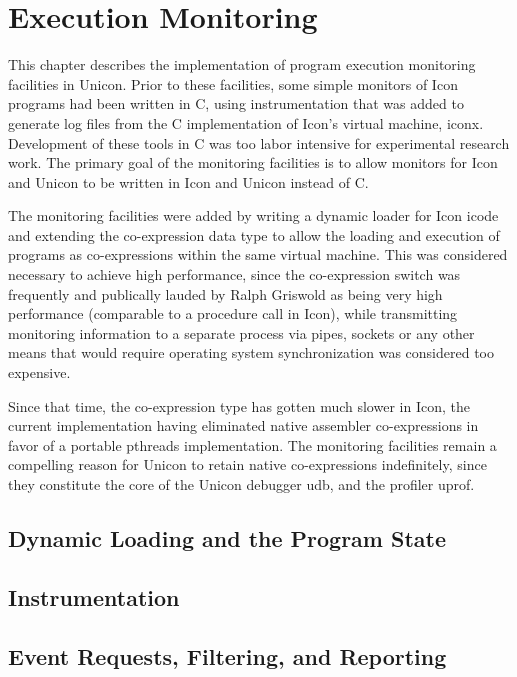 \chapter{Execution Monitoring}

This chapter describes the implementation of program execution
monitoring facilities in Unicon. Prior to these facilities, some
simple monitors of Icon programs had been written in C, using
instrumentation that was added to generate log files from the C
implementation of Icon's virtual machine, iconx. Development of these
tools in C was too labor intensive for experimental research work. The
primary goal of the monitoring facilities is to allow monitors for
Icon and Unicon to be written in Icon and Unicon instead of C.

The monitoring facilities were added by writing a dynamic loader for
Icon icode and extending the co-expression data type to allow the
loading and execution of programs as co-expressions within the same
virtual machine. This was considered necessary to achieve high
performance, since the co-expression switch was frequently and
publically lauded by Ralph Griswold as being very high performance
(comparable to a procedure call in Icon), while transmitting
monitoring information to a separate process via pipes, sockets or
any other means that would require operating system synchronization
was considered too expensive.

Since that time, the co-expression type has gotten much slower in
Icon, the current implementation having eliminated native assembler
co-expressions in favor of a portable pthreads implementation. The
monitoring facilities remain a compelling reason for Unicon to retain
native co-expressions indefinitely, since they constitute the core
of the Unicon debugger udb, and the profiler uprof.

\section{Dynamic Loading and the Program State}

\section{Instrumentation}

\section{Event Requests, Filtering, and Reporting}
